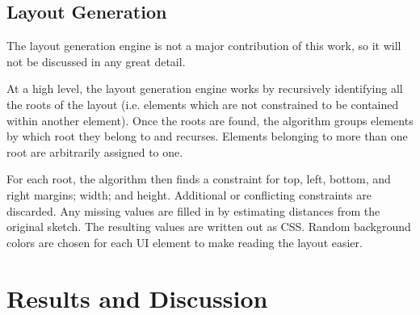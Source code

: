 \documentclass{article}
\begin{document}
\subsection{Layout Generation}
\label{sec:layout-gen}

The layout generation engine is not a major contribution of this work, so it
will not be discussed in any great detail.

At a high level, the layout generation engine works by recursively identifying
all the roots of the layout (i.e. elements which are not constrained to be
contained within another element). Once the roots are found, the algorithm
groups elements by which root they belong to and recurses. Elements belonging
to more than one root are arbitrarily assigned to one.

For each root, the algorithm then finds a constraint for top, left, bottom, and
right margins; width; and height. Additional or conflicting constraints are
discarded. Any missing values are filled in by estimating distances from the
original sketch. The resulting values are written out as CSS. Random background
colors are chosen for each UI element to make reading the layout easier.

\section{Results and Discussion}
\end{document}

